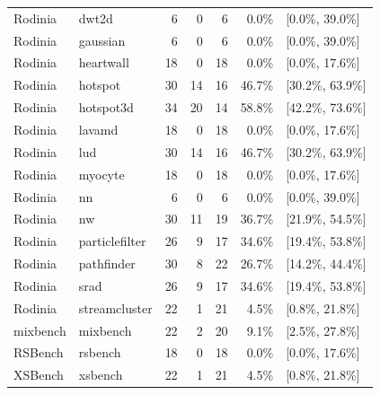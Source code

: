 \begin{table}[!htbp]
\begin{tabular}{@{}llrrrrl@{}}
Rodinia & dwt2d & 6 & 0 & 6 & 0.0\% & [0.0\%, 39.0\%] \\
Rodinia & gaussian & 6 & 0 & 6 & 0.0\% & [0.0\%, 39.0\%] \\
Rodinia & heartwall & 18 & 0 & 18 & 0.0\% & [0.0\%, 17.6\%] \\
Rodinia & hotspot & 30 & 14 & 16 & 46.7\% & [30.2\%, 63.9\%] \\
Rodinia & hotspot3d & 34 & 20 & 14 & 58.8\% & [42.2\%, 73.6\%] \\
Rodinia & lavamd & 18 & 0 & 18 & 0.0\% & [0.0\%, 17.6\%] \\
Rodinia & lud & 30 & 14 & 16 & 46.7\% & [30.2\%, 63.9\%] \\
Rodinia & myocyte & 18 & 0 & 18 & 0.0\% & [0.0\%, 17.6\%] \\
Rodinia & nn & 6 & 0 & 6 & 0.0\% & [0.0\%, 39.0\%] \\
Rodinia & nw & 30 & 11 & 19 & 36.7\% & [21.9\%, 54.5\%] \\
Rodinia & particlefilter & 26 & 9 & 17 & 34.6\% & [19.4\%, 53.8\%] \\
Rodinia & pathfinder & 30 & 8 & 22 & 26.7\% & [14.2\%, 44.4\%] \\
Rodinia & srad & 26 & 9 & 17 & 34.6\% & [19.4\%, 53.8\%] \\
Rodinia & streamcluster & 22 & 1 & 21 & 4.5\% & [0.8\%, 21.8\%] \\
\midrule
mixbench & mixbench & 22 & 2 & 20 & 9.1\% & [2.5\%, 27.8\%] \\
RSBench & rsbench & 18 & 0 & 18 & 0.0\% & [0.0\%, 17.6\%] \\
XSBench & xsbench & 22 & 1 & 21 & 4.5\% & [0.8\%, 21.8\%] \\
\bottomrule
\end{tabular}
\end{table}

